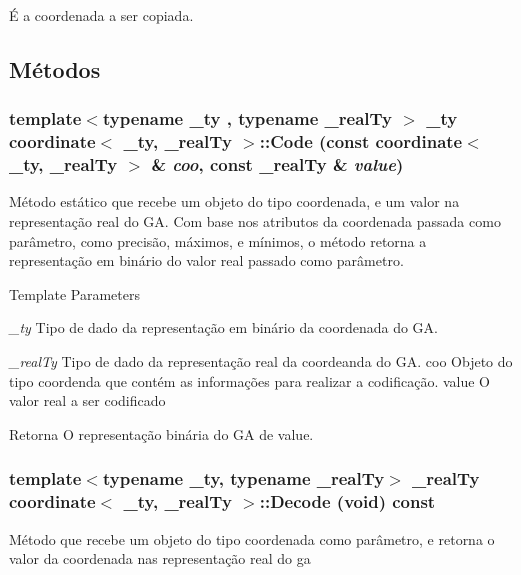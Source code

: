 É a coordenada a ser copiada. 

\subsection{Métodos}
\hypertarget{classcoordinate_adac8246ca9452ff459e46e2d1b981466}{
\subsubsection[{Code}]{\setlength{\rightskip}{0pt plus 5cm}template$<$typename \_\-ty , typename \_\-realTy $>$ \_\-ty {\bf coordinate}$<$ \_\-ty, \_\-realTy $>$::Code (const {\bf coordinate}$<$ \_\-ty, \_\-realTy $>$ \& {\em coo}, \/  const \_\-realTy \& {\em value})}}
\label{classcoordinate_adac8246ca9452ff459e46e2d1b981466}
Método estático que recebe um objeto do tipo coordenada, e um valor na representação real do GA. Com base nos atributos da coordenada passada como parâmetro, como precisão, máximos, e mínimos, o método retorna a representação em binário do valor real passado como parâmetro.


\begin{DoxyTemplParams}{Template Parameters}
\item[{\em \_\-ty}]Tipo de dado da representação em binário da coordenada do GA. \item[{\em \_\-realTy}]Tipo de dado da representação real da coordeanda do GA.  coo Objeto do tipo coordenda que contém as informações para realizar a codificação.  value O valor real a ser codificado\end{DoxyTemplParams}
\begin{DoxyReturn}{Retorna}
O representação binária do GA de value. 
\end{DoxyReturn}
\hypertarget{classcoordinate_a03f63a984d0b894f2056e3014eb570a3}{
\subsubsection[{Decode}]{\setlength{\rightskip}{0pt plus 5cm}template$<$typename \_\-ty, typename \_\-realTy$>$ \_\-realTy {\bf coordinate}$<$ \_\-ty, \_\-realTy $>$::Decode (void) const}}
\label{classcoordinate_a03f63a984d0b894f2056e3014eb570a3}
Método que recebe um objeto do tipo coordenada como parâmetro, e retorna o valor da coordenada nas representação real do ga


